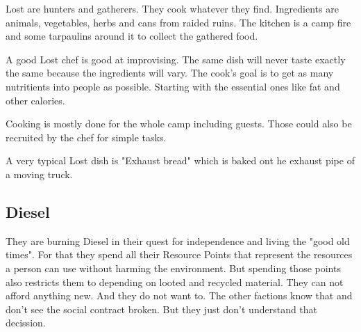 Lost are hunters and gatherers. They cook whatever they find. Ingredients are animals, vegetables, herbs and cans from raided ruins. The kitchen is a camp fire and some tarpaulins around it to collect the gathered food.

A good Lost chef is good at improvising. The same dish will never taste exactly the same because the ingredients will vary. The cook's goal is to get as many nutritients into people as possible. Starting with the essential ones like fat and other calories.

Cooking is mostly done for the whole camp including guests. Those could also be recruited by the chef for simple tasks.

A very typical Lost dish is "Exhaust bread" which is baked ont he exhaust pipe of a moving truck.

\subsection{Diesel}

They are burning Diesel in their quest for independence and living the "good old times". For that they spend all their Resource Points that represent the resources a person can use without harming the environment. But spending those points also restricts them to depending on looted and recycled material. They can not afford anything new. And they do not want to.
The other factions know that and don't see the social contract broken. But they just don't understand that decission.

